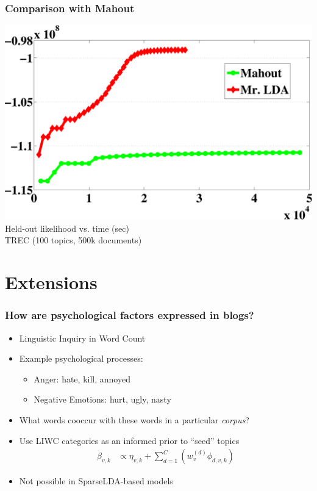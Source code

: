\begin{frame}
	\frametitle{Comparison with Mahout}
	
	\centering
	\includegraphics[width=0.95\linewidth]{mrlda/bespin-topic-100} \\
	Held-out likelihood vs. time (sec) \\
	TREC (100 topics, 500k documents)
	

\end{frame}

\section{Extensions}

\begin{frame}

	\frametitle{How are psychological factors expressed in blogs?}

	\begin{itemize}
		\item Linguistic Inquiry in Word Count~\cite{pennebaker-99}
		\item Example psychological processes:
		\begin{itemize}
			\item Anger: hate, kill, annoyed
			\item Negative Emotions: hurt, ugly, nasty
		\end{itemize}
		\item What words cooccur with these words in a particular \emph{corpus}?
		\pause
		\item Use LIWC categories as an informed prior to ``seed'' topics
		\begin{align*}
\beta_{v, k} & \propto \eta_{v,k} + \sum_{d=1}^{C} ( w^{(d)}_v \phi_{d, v, k})
\end{align*}
	\pause
	\item Not possible in SparseLDA-based models
	\end{itemize}


\end{frame}


